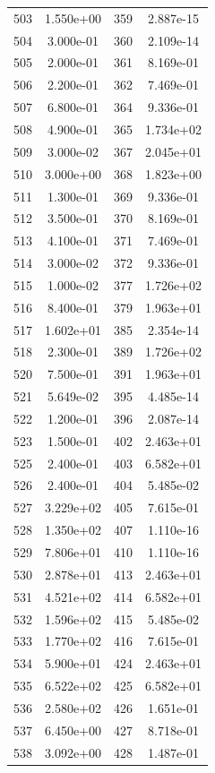\documentclass[12pt]{article}
\begin{document}
\begin{longtable}{@{}cccc@{}}
503 & 1.550e+00 & 359 & 2.887e-15 \\
504 & 3.000e-01 & 360 & 2.109e-14 \\
505 & 2.000e-01 & 361 & 8.169e-01 \\
506 & 2.200e-01 & 362 & 7.469e-01 \\
507 & 6.800e-01 & 364 & 9.336e-01 \\
508 & 4.900e-01 & 365 & 1.734e+02 \\
509 & 3.000e-02 & 367 & 2.045e+01 \\
510 & 3.000e+00 & 368 & 1.823e+00 \\
511 & 1.300e-01 & 369 & 9.336e-01 \\
512 & 3.500e-01 & 370 & 8.169e-01 \\
513 & 4.100e-01 & 371 & 7.469e-01 \\
514 & 3.000e-02 & 372 & 9.336e-01 \\
515 & 1.000e-02 & 377 & 1.726e+02 \\
516 & 8.400e-01 & 379 & 1.963e+01 \\
517 & 1.602e+01 & 385 & 2.354e-14 \\
518 & 2.300e-01 & 389 & 1.726e+02 \\
520 & 7.500e-01 & 391 & 1.963e+01 \\
521 & 5.649e-02 & 395 & 4.485e-14 \\
522 & 1.200e-01 & 396 & 2.087e-14 \\
523 & 1.500e-01 & 402 & 2.463e+01 \\
525 & 2.400e-01 & 403 & 6.582e+01 \\
526 & 2.400e-01 & 404 & 5.485e-02 \\
527 & 3.229e+02 & 405 & 7.615e-01 \\
528 & 1.350e+02 & 407 & 1.110e-16 \\
529 & 7.806e+01 & 410 & 1.110e-16 \\
530 & 2.878e+01 & 413 & 2.463e+01 \\
531 & 4.521e+02 & 414 & 6.582e+01 \\
532 & 1.596e+02 & 415 & 5.485e-02 \\
533 & 1.770e+02 & 416 & 7.615e-01 \\
534 & 5.900e+01 & 424 & 2.463e+01 \\
535 & 6.522e+02 & 425 & 6.582e+01 \\
536 & 2.580e+02 & 426 & 1.651e-01 \\
537 & 6.450e+00 & 427 & 8.718e-01 \\
538 & 3.092e+00 & 428 & 1.487e-01 \\

\end{longtable}
\end{document}
